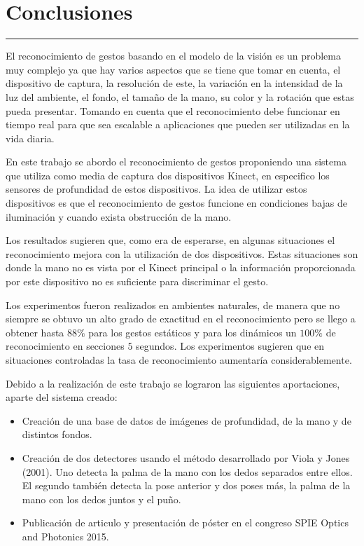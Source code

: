 \chapter{Conclusiones}\label{capit:cap6}
\vspace{-2.0325ex}%
\noindent
\rule{\textwidth}{0.5pt}
\vspace{-5.5ex}%
\newcommand{\pushline}{\Indp}%

El reconocimiento de gestos basando en el modelo de la visión es un problema muy complejo ya que hay varios aspectos que se tiene que tomar en cuenta, el dispositivo de captura, la resolución de este, la variación en la intensidad de la luz del ambiente, el fondo, el tamaño de la mano, su color y la rotación que estas pueda presentar. Tomando en cuenta que el reconocimiento debe funcionar en tiempo real para que sea escalable a aplicaciones que pueden ser utilizadas en la vida diaria. 

En este trabajo se abordo el reconocimiento de gestos proponiendo una sistema que utiliza como media de captura dos dispositivos Kinect, en especifico los sensores de profundidad de estos dispositivos. La idea de utilizar estos dispositivos es que el reconocimiento de gestos funcione en condiciones bajas de iluminación y cuando exista obstrucción de la mano.  

Los resultados sugieren que, como era de esperarse, en algunas situaciones el reconocimiento mejora con la utilización de dos dispositivos. Estas situaciones son donde la mano no es vista por el Kinect principal o la información proporcionada por este dispositivo no es suficiente para discriminar el gesto.
   
Los experimentos fueron realizados en ambientes naturales, de manera que no siempre se obtuvo un alto grado de exactitud en el reconocimiento pero se llego a obtener hasta $88 \%$ para los gestos estáticos y para los dinámicos un $100 \%$ de reconocimiento en secciones $5$ segundos. Los experimentos sugieren que en situaciones controladas la tasa de reconocimiento aumentaría considerablemente. 

Debido a la realización de este trabajo se lograron las siguientes aportaciones, aparte del sistema creado: 
 
\begin{itemize}
\item Creación de una base de datos de imágenes de profundidad, de la mano y de distintos fondos.   

\item Creación de dos detectores usando el método desarrollado por Viola y Jones (2001). Uno detecta la palma de la mano con los dedos separados entre ellos. El segundo también detecta la pose anterior y dos poses más, la palma de la mano con los dedos juntos y el puño. 

\item Publicación de articulo y presentación de póster en el congreso SPIE Optics and Photonics 2015.     

\end{itemize}


